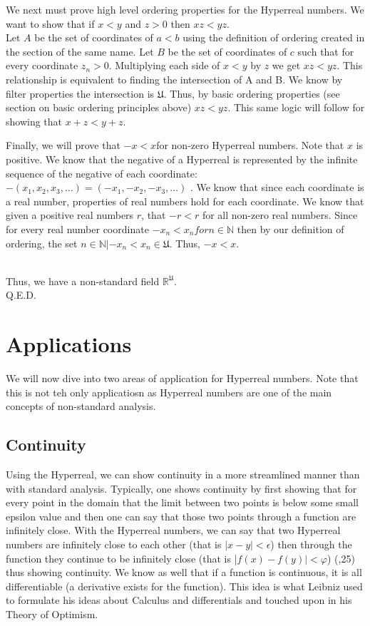 \documentclass[12pt]{report}
\newcommand{\R}{\mathbb{R}}
\newcommand{\N}{\mathbb{N}}
\newcommand{\U}{\mathfrak{U}}
\begin{document}
We next must prove high level ordering properties for the Hyperreal numbers. \newline
We want to show that if $x<y$ and $z>0$ then $xz<yz$. \\
Let $A$ be the set of coordinates of $a<b$ using the definition of ordering created in the section of the same name.
Let $B$ be the set of coordinates of $c$ such that for every coordinate $z_n > 0$.
Multiplying each side of $x<y$ by $z$ we get $xz<yz$.
This relationship is equivalent to finding the intersection of A and B.
We know by filter properties the intersection is $\U$.
Thus, by basic ordering properties (see section on basic ordering principles above) $xz<yz$.
This same logic will follow for showing that $x+z < y+z$.

\newline \par
Finally, we will prove that $-x <x $for non-zero Hyperreal numbers.
Note that $x$ is positive.
We know that the negative of a Hyperreal is represented by the infinite sequence of the negative of each coordinate: $-(x_1, x_2,x_3,\ldots) = (-x_1,- x_2,-x_3,\ldots)$ .
We know that since each coordinate is a real number, properties of real numbers hold for each coordinate.
We know that given a positive real numbers $r$, that $-r< r$ for all non-zero real numbers.
Since for every real number coordinate $-x_n <x_n for n \in \N $ then by our definition of ordering, the set ${n \in \N| -x_n < x_n } \in \U$.
Thus, $-x <x $.

\\ \newline
Thus, we have a non-standard field $\R^{\U}$.\\
Q.E.D.


\chapter*{Applications}
We will now dive into two areas of application for Hyperreal numbers.
Note that this is not teh only applicatiosn as Hyperreal numbers are one of the main concepts of non-standard analysis.
\section*{Continuity}
Using the Hyperreal, we can show continuity in a more streamlined manner than with standard analysis.
Typically, one shows continuity by first showing that for every point in the domain that the limit between two points is below some small epsilon value and then one can say that those two points through a function are infinitely close.
With the Hyperreal numbers, we can say that two Hyperreal numbers are infinitely close to each other (that is $|x-y|< \epsilon$) then through the function they continue to be infinitely close (that is |$f(x)-f(y)|<\varphi$) (,25) thus showing continuity.
We know as well that if a function is continuous, it is all differentiable (a derivative exists for the function).
This idea is what Leibniz used to formulate his ideas about Calculus and differentials and touched upon in his Theory of Optimism.
\end{document}
